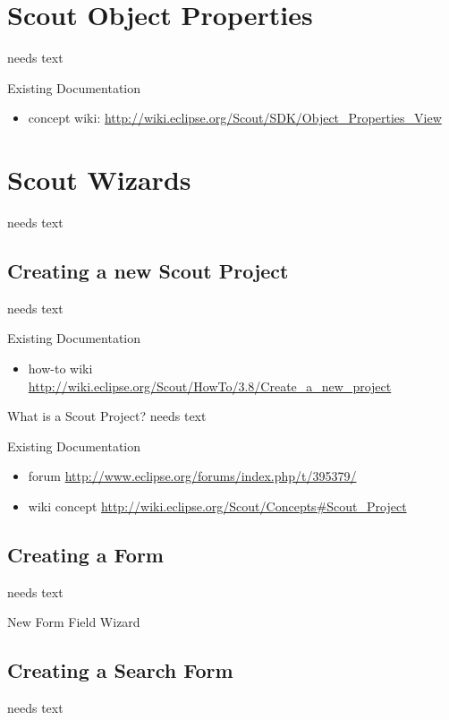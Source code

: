 \documentclass[a4paper,10pt,twoside]{book}
\begin{document}
\section{Scout Object Properties}
needs text

\noindent Existing Documentation
\begin{itemize}
  \item concept wiki: \url{http://wiki.eclipse.org/Scout/SDK/Object_Properties_View}
\end{itemize}

\section{Scout Wizards}
needs text

\subsection{Creating a new Scout Project}
needs text

\noindent Existing Documentation
\begin{itemize}
  \item how-to wiki \url{http://wiki.eclipse.org/Scout/HowTo/3.8/Create_a_new_project}
\end{itemize}

What is a Scout Project?
needs text

\noindent Existing Documentation
\begin{itemize}
  \item forum \url{http://www.eclipse.org/forums/index.php/t/395379/}
  \item wiki concept \url{http://wiki.eclipse.org/Scout/Concepts#Scout_Project}
\end{itemize}

\subsection{Creating a Form}
needs text

New Form Field Wizard

\subsection{Creating a Search Form}
needs text
\end{document}
